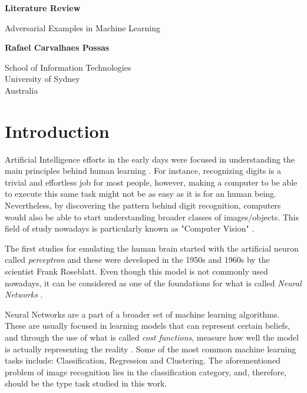 \documentclass{article}
\begin{document}
\begin{titlepage}
    \begin{center}
        \vspace*{1cm}
        \huge
        \textbf{Literature Review}
        
        \vspace{0.5cm}
        \LARGE
        Adversarial Examples in Machine Learning

        
        \vspace{1.5cm}
        
        \textbf{Rafael Carvalhaes Possas}
        
        \vfill
        
        \vspace{0.8cm}
        
        
        School of Information Technologies\\
        University of Sydney\\
        Australia\\

        
    \end{center}
\end{titlepage}
\section{Introduction}\label{sec:intro}

Artificial Intelligence efforts in the early days were focused in understanding the main principles behind human learning \cite{nielsen2016}. For instance, recognizing digits is a trivial and effortless job for most people, however, making a computer to be able to execute this same task might not be as easy as it is for an human being. Nevertheless, by discovering the pattern behind digit recognition, computers would also be able to start understanding broader classes of images/objects. This field of study nowadays is particularly known as "Computer Vision" \cite{goodfellow2016_book}.

The first studies for emulating the human brain started with the artificial neuron called \textit{perceptron} and these were developed in the 1950s and 1960s by the scientist Frank Roseblatt. Even though this model is not commonly used nowadays, it can be considered as one of the foundations for what is called \textit{Neural Networks} \cite{nielsen2016}. 

Neural Networks are a part of a broader set of machine learning algorithms. These are usually  focused in learning models that can represent certain beliefs, and through the use of what is called \textit{cost functions}, measure how well the model is actually representing the reality \cite{goodfellow2016_book}. Some of the most common machine learning tasks include: Classification, Regression and Clustering. The aforementioned problem of image recognition lies in the classification category, and, therefore, should be the type task studied in this work.
\end{document}
